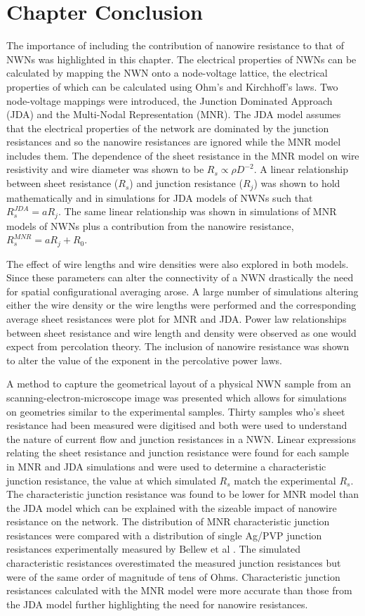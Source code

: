 \section{Chapter Conclusion}
\label{sec:Conclusion}
The importance of including the contribution of nanowire resistance to that of NWNs was highlighted in this chapter. The electrical properties of NWNs can be calculated by mapping the NWN onto a node-voltage lattice, the electrical properties of which can be calculated using Ohm's and Kirchhoff's laws. Two node-voltage mappings were introduced, the Junction Dominated Approach (JDA) and the Multi-Nodal Representation (MNR). The JDA model assumes that the electrical properties of the network are dominated by the junction resistances and so the nanowire resistances are ignored while the MNR model includes them. The dependence of the sheet resistance in the MNR model on wire resistivity and wire diameter was shown to be $R_s \propto \rho D^{-2}$. A linear relationship between sheet resistance ($R_s$) and junction resistance ($R_j$) was shown to hold mathematically and in simulations for JDA models of NWNs such that $R_s^{JDA} = a R_j$. The same linear relationship was shown in simulations of MNR models of NWNs plus a contribution from the nanowire resistance, $R_s^{MNR}=a R_j + R_0$. 

The effect of wire lengths and wire densities were also explored in both models. Since these parameters can alter the connectivity of a NWN drastically the need for spatial configurational averaging arose. A large number of simulations altering either the wire density or the wire lengths were performed and the corresponding average sheet resistances were plot for MNR and JDA. Power law relationships between sheet resistance and wire length and density were observed as one would expect from percolation theory. The inclusion of nanowire resistance was shown to alter the value of the exponent in the percolative power laws.

A method to capture the geometrical layout of a physical NWN sample from an scanning-electron-microscope image was presented which allows for simulations on geometries similar to the experimental samples. Thirty samples who's sheet resistance had been measured were digitised and both were used to understand the nature of current flow and junction resistances in a NWN. Linear expressions relating the sheet resistance and junction resistance were found for each sample in MNR and JDA simulations and were used to determine a characteristic junction resistance, the value at which simulated $R_s$ match the experimental $R_s$. The characteristic junction resistance was found to be lower for MNR model than the JDA model which can be explained with the sizeable impact of nanowire resistance on the network. The distribution of MNR characteristic junction resistances were compared with a distribution of single Ag/PVP junction resistances experimentally measured by Bellew et al \cite{bellew2015}. The simulated characteristic resistances overestimated the measured junction resistances but were of the same order of magnitude of tens of Ohms. Characteristic junction resistances calculated with the MNR model were more accurate than those from the JDA model further highlighting the need for nanowire resistances.

